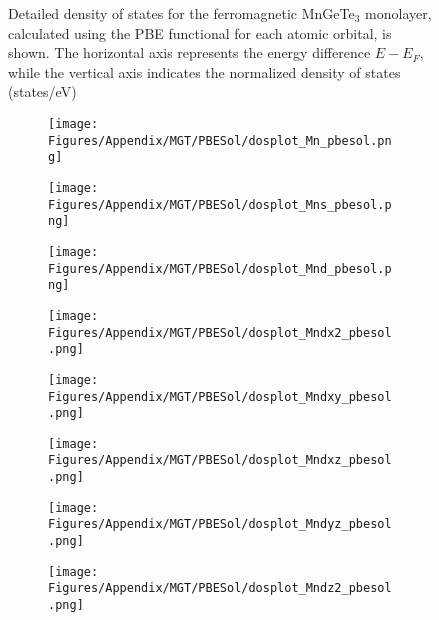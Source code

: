 \begin{figure}[H]
\caption{Detailed density of states for the ferromagnetic MnGeTe$_3$ monolayer, calculated using the PBE functional for each atomic orbital, is shown. The horizontal axis represents the energy difference $E - E_F$, while the vertical axis indicates the normalized density of states (states/eV)}
\label{Mnpbe}
\end{figure}
\newpage
 \begin{figure}[H]
      \centering
    \begin{subfigure}{0.24\textwidth}
    \texttt{[image: Figures/Appendix/MGT/PBESol/dosplot\_Mn\_pbesol.png]}
    \label{dosplot_Mn_pbesol}   
    \end{subfigure}  
    \hfill
\begin{subfigure}{0.24\textwidth}
\centering
    \texttt{[image: Figures/Appendix/MGT/PBESol/dosplot\_Mns\_pbesol.png]}
    \label{dosplot_Mns_pbesol}
\end{subfigure}
\hfill
\begin{subfigure}{0.24\textwidth}
    \texttt{[image: Figures/Appendix/MGT/PBESol/dosplot\_Mnd\_pbesol.png]}
    \label{dosplot_Mnd_pbesol}
\end{subfigure}
\hfill
\begin{subfigure}{0.24\textwidth}
    \texttt{[image: Figures/Appendix/MGT/PBESol/dosplot\_Mndx2\_pbesol.png]}
    \label{dodosplot_Mndx2_pbesol}
\end{subfigure}
\hfill
\begin{subfigure}{0.24\textwidth}
    \texttt{[image: Figures/Appendix/MGT/PBESol/dosplot\_Mndxy\_pbesol.png]}
    \label{dosplot_Mndxy_pbesol}
\end{subfigure}
\hfill
\begin{subfigure}{0.24\textwidth}
    \texttt{[image: Figures/Appendix/MGT/PBESol/dosplot\_Mndxz\_pbesol.png]}
    \label{dosplot_Mndxz_pbesol}
\end{subfigure}
\hfill
\begin{subfigure}{0.24\textwidth}
    \texttt{[image: Figures/Appendix/MGT/PBESol/dosplot\_Mndyz\_pbesol.png]}
    \label{dosplot_Mndyz_pbesol}
\end{subfigure}
\hfill
\begin{subfigure}{0.24\textwidth}
    \texttt{[image: Figures/Appendix/MGT/PBESol/dosplot\_Mndz2\_pbesol.png]}
    \label{dosplot_Mndz2_pbesol}
\end{subfigure}

\end{figure}
